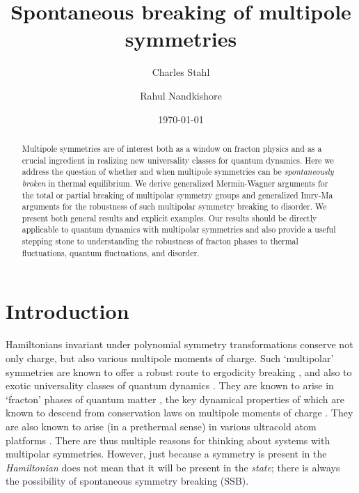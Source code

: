 \documentclass[twocolumn, longbibliography]{revtex4-2}
\begin{document}
	
\title{Spontaneous breaking of multipole symmetries}
\author{Charles Stahl}
\author{Rahul Nandkishore}

	
\begin{abstract}
Multipole symmetries are of interest both as a window on fracton physics and as a crucial ingredient in realizing new universality classes for quantum dynamics. Here we address the question of whether and when multipole symmetries can be {\it spontaneously broken} in thermal equilibrium. We derive generalized Mermin-Wagner arguments for the total or partial breaking of multipolar symmetry groups and generalized Imry-Ma arguments for the robustness of such multipolar symmetry breaking to disorder. We present both general results and explicit examples. Our results should be directly applicable to quantum dynamics with multipolar symmetries and also provide a useful stepping stone to understanding the robustness of fracton phases to thermal fluctuations, quantum fluctuations, and disorder. 
\end{abstract}
	
\date{\today}
	
\maketitle

\section{Introduction}

Hamiltonians invariant under polynomial symmetry transformations conserve not only charge, but also various multipole moments of charge. Such `multipolar' symmetries are known to offer a robust route to ergodicity breaking \cite{PPN, KHN, Sala, Moudgalya, SLIOM, commutant}, and also to exotic universality classes of quantum dynamics \cite{Iaconis1, GLN, nonabelian, glorioso, MKH, Feldmeier, Iaconis2}. They are known to arise in `fracton' phases of quantum matter \cite{Chamon, Haah, VHF1, VHF2, NH, PretkoRadzihovsky}, the key dynamical properties of which are known to descend from conservation laws on multipole moments of charge \cite{Pretko1, BB,  Gromov2019}. They are also known to arise (in a prethermal sense) in various ultracold atom platforms \cite{KHN, Bakr, Aidelsburger}. There are thus multiple reasons for thinking about systems with multipolar symmetries. However, just because a symmetry is present in the {\it Hamiltonian} does not mean that it will be present in the {\it state}; there is always the possibility of spontaneous symmetry breaking (SSB). 
\end{document}
